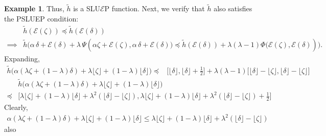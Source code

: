 \documentclass[12pt, reqno]{amsart}
\theoremstyle{definition}
\newtheorem{example}{Example}[section]
\theoremstyle{remark}
\numberwithin{equation}{section}
\begin{document}
\begin{example}
Thus, $\tilde{h}$ is a SLU$\mathcal{E}$P function.
Next, we verify that $\tilde{h}$ also satisfies the PSLUEP condition:
\begin{equation*}
\begin{aligned}
 &\tilde{h}(\mathcal{E}(\zeta)) \preceq \tilde{h}(\mathcal{E}(\delta))\\ 
\implies&
    \tilde{h}\big(\alpha\, \delta + \mathcal{E}(\delta) + \lambda\, \Psi(\alpha\zeta+\mathcal{E}(\zeta), \alpha\, \delta + \mathcal{E}(\delta) \big) 
\preceq \tilde{h}(\mathcal{E}(\delta)) + \lambda(\lambda-1)\mathfrak{\Phi}\big(\mathcal{E}(\zeta), \mathcal{E}(\delta))\big).   
\end{aligned}
\end{equation*}
Expanding,
\begin{equation*}
    \begin{aligned}
        \tilde{h}\big(\alpha(\lambda \zeta+(1-\lambda)\delta)+\lambda \lfloor \zeta \rfloor+(1-\lambda)\lfloor \delta \rfloor\big)\preceq& \big[\lfloor \delta \rfloor,\lfloor \delta \rfloor+\tfrac{1}{2}\big]+\lambda(\lambda-1)\big[\lfloor \delta \rfloor-\lfloor \zeta \rfloor,\lfloor \delta \rfloor-\lfloor \zeta \rfloor\big]
    \end{aligned}
\end{equation*}
\begin{equation*}
    \begin{aligned}
        &\tilde{h}\big(\alpha(\lambda \zeta+(1-\lambda)\delta)+\lambda \lfloor \zeta \rfloor+(1-\lambda)\lfloor \delta \rfloor\big)\\
        \preceq& \big[\lambda \lfloor \zeta \rfloor+(1-\lambda)\lfloor \delta \rfloor+\lambda^2(\lfloor \delta \rfloor-\lfloor \zeta \rfloor),\lambda \lfloor \zeta \rfloor+(1-\lambda)\lfloor \delta \rfloor+\lambda^2(\lfloor \delta \rfloor-\lfloor \zeta \rfloor)+\tfrac{1}{2} \big]
    \end{aligned}
\end{equation*}
Clearly,
\begin{equation*}
    \begin{aligned}
        \alpha(\lambda \zeta+(1-\lambda)\delta)+\lambda \lfloor \zeta \rfloor+(1-\lambda)\lfloor \delta \rfloor \leq \lambda \lfloor \zeta \rfloor+(1-\lambda)\lfloor \delta \rfloor+\lambda^2(\lfloor \delta \rfloor-\lfloor \zeta \rfloor)
    \end{aligned}
\end{equation*}
also 
\begin{equation*}
    \begin{aligned}

\end{aligned}
\end{equation*}
\end{example}
\end{document}
